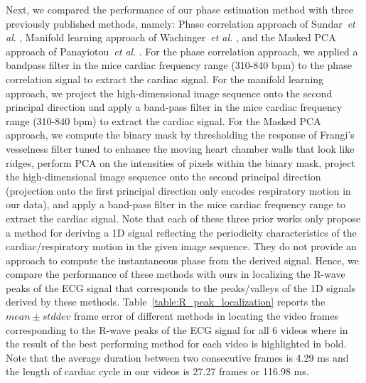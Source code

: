 \documentclass[journal]{IEEEtran}
\newcommand{\etal}{~\textit{et al}. }
\begin{document}
Next, we compared the performance of our phase estimation method with three previously published methods, namely: Phase correlation approach of Sundar\etal\cite{Sundar2009}, Manifold learning approach of Wachinger\etal\cite{Wachinger2012}, and the Masked PCA approach of Panayiotou\etal\cite{Panayiotou2014}. For the phase correlation approach, we applied a bandpass filter in the mice cardiac frequency range (310-840 bpm) to the phase correlation signal to extract the cardiac signal. For the manifold learning approach, we project the high-dimensional image sequence onto the second principal direction and apply a band-pass filter in the mice cardiac frequency range (310-840 bpm) to extract the cardiac signal. For the Masked PCA approach, we compute the binary mask by thresholding the response of Frangi's vesselness filter tuned to enhance the moving heart chamber walls that look like ridges, perform PCA on the intensities of pixels within the binary mask,  project the high-dimensional image sequence onto the second principal direction (projection onto the first principal direction only encodes respiratory motion in our data), and apply a band-pass filter in the mice cardiac frequency range to extract the cardiac signal. Note that each of these three prior works only propose a method for deriving a 1D signal reflecting the periodicity characteristics of the cardiac/respiratory motion in the given image sequence. They do not provide an approach to compute the instantaneous phase from the derived signal. Hence, we compare the performance of these methods with ours in localizing the R-wave peaks of the ECG signal that corresponds to the peaks/valleys of the 1D signals derived by these methods. Table~\ref{table:R_peak_localization} reports the $mean \pm stddev$ frame error of different methods in locating the video frames corresponding to the R-wave peaks of the ECG signal for all 6 videos where in the result of the best performing method for each video is highlighted in bold. Note that the average duration between two consecutive frames is 4.29 ms and the length of cardiac cycle in our videos is 27.27 frames or 116.98 ms.
	
\end{document}

